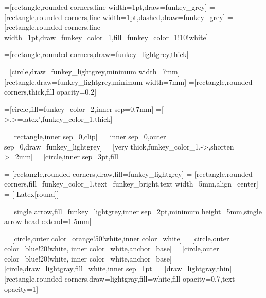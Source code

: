 \usetikzlibrary{arrows}
\usetikzlibrary{arrows.meta}
\usetikzlibrary{backgrounds}
\usetikzlibrary{calc}
\usetikzlibrary{chains}
\usetikzlibrary{decorations.markings}
\usetikzlibrary{decorations.pathmorphing}
\usetikzlibrary{fit}
\usetikzlibrary{matrix}
\usetikzlibrary{mindmap}
\usetikzlibrary{pgfplots.colormaps}
\usetikzlibrary{positioning}
\usetikzlibrary{shadows}
\usetikzlibrary{shapes}
\usetikzlibrary{trees}

\newlength\patchwidth
\newlength\intrasamplerowsep
\newlength\intersamplerowsep



=[rectangle,rounded corners,line width=1pt,draw=funkey_grey]
=[rectangle,rounded corners,line width=1pt,dashed,draw=funkey_grey]
=[rectangle,rounded corners,line width=1pt,draw=funkey_color_1,fill=funkey_color_1!10!white]

=[rectangle,rounded corners,draw=funkey_lightgrey,thick]

=[circle,draw=funkey_lightgrey,minimum width=7mm]
=[rectangle,draw=funkey_lightgrey,minimum width=7mm]
=[rectangle,rounded corners,thick,fill opacity=0.2]

=[circle,fill=funkey_color_2,inner sep=0.7mm]
=[->,>=latex',funkey_color_1,thick]

=
  [rectangle,inner sep=0,clip]
=
  [inner sep=0,outer sep=0,draw=funkey_lightgrey]
=
  [very thick,funkey_color_1,->,shorten >=2mm]
=
  [circle,inner sep=3pt,fill]

=
  [rectangle,rounded corners,draw,fill=funkey_lightgrey]
=
  [rectangle,rounded corners,fill=funkey_color_1,text=funkey_bright,text width=5mm,align=center]
=
  [-{Latex[round]}]

=
  [single arrow,fill=funkey_lightgrey,inner sep=2pt,minimum height=5mm,single arrow head extend=1.5mm]

=
  [circle,outer color=orange!50!white,inner color=white]
=
  [circle,outer color=blue!20!white, inner color=white,anchor=base]
=
  [circle,outer color=blue!20!white, inner color=white,anchor=base]
=
  [circle,draw=lightgray,fill=white,inner sep=1pt]
=
  [draw=lightgray,thin]
=
  [rectangle,rounded corners,draw=lightgray,fill=white,fill opacity=0.7,text opacity=1]

